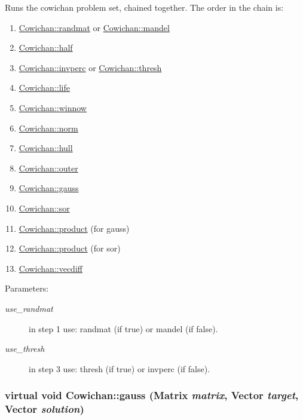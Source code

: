 Runs the cowichan problem set, chained together. The order in the chain is: \begin{enumerate}
\item \hyperlink{class_cowichan_c44cacf9d9e363a5b076bcee8b9a7a73}{Cowichan::randmat} or \hyperlink{class_cowichan_ec6cc4eb2ad444474b923532167e98a2}{Cowichan::mandel} \item \hyperlink{class_cowichan_308603053675bccbe631f04af921f57c}{Cowichan::half} \item \hyperlink{class_cowichan_ea126792a31e54a8722663b7ea768955}{Cowichan::invperc} or \hyperlink{class_cowichan_a0b633b8c1f21884e0998a9c7020c08c}{Cowichan::thresh} \item \hyperlink{class_cowichan_d449595ef2fe934bdd128ac8b1f51d07}{Cowichan::life} \item \hyperlink{class_cowichan_13d60e06ced3b5da79d62c133ce82337}{Cowichan::winnow} \item \hyperlink{class_cowichan_3df21e3c627958114e045c3559a29f30}{Cowichan::norm} \item \hyperlink{class_cowichan_0c6b68ae3c059b66893405f8530a2e0a}{Cowichan::hull} \item \hyperlink{class_cowichan_52f17221019290b88334b0ca7f3bcdb9}{Cowichan::outer} \item \hyperlink{class_cowichan_aa9aac74b96dc5ed33e821d94649d1b2}{Cowichan::gauss} \item \hyperlink{class_cowichan_92d8d9ae77208115fdfe69e1174f601c}{Cowichan::sor} \item \hyperlink{class_cowichan_3d7d4b581a1d6f0392dc452830fb3b03}{Cowichan::product} (for gauss) \item \hyperlink{class_cowichan_3d7d4b581a1d6f0392dc452830fb3b03}{Cowichan::product} (for sor) \item \hyperlink{class_cowichan_775d72b5e7d122f9f32555352278250e}{Cowichan::vecdiff} \end{enumerate}
\begin{Desc}
\item[Parameters:]
\begin{description}
\item[{\em use\_\-randmat}]in step 1 use: randmat (if true) or mandel (if false). \item[{\em use\_\-thresh}]in step 3 use: thresh (if true) or invperc (if false). \end{description}
\end{Desc}
\hypertarget{class_cowichan_aa9aac74b96dc5ed33e821d94649d1b2}{
\subsubsection[{gauss}]{\setlength{\rightskip}{0pt plus 5cm}virtual void Cowichan::gauss ({\bf Matrix} {\em matrix}, \/  {\bf Vector} {\em target}, \/  {\bf Vector} {\em solution})}}
\label{class_cowichan_aa9aac74b96dc5ed33e821d94649d1b2}


